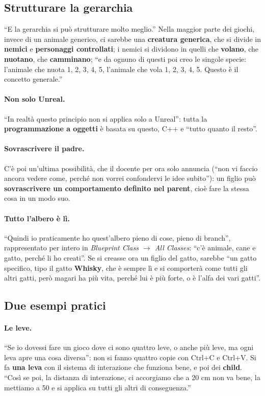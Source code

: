 \subsection{Strutturare la gerarchia}

``E la gerarchia si può strutturare molto meglio.'' Nella maggior parte dei
giochi, invece di un animale generico, ci sarebbe una \textbf{creatura
generica}, che si divide in \textbf{nemici} e \textbf{personaggi controllati};
i nemici si dividono in quelli che \textbf{volano}, che \textbf{nuotano}, che
\textbf{camminano}; ``e da ognuno di questi poi creo le singole specie: l'animale
che nuota 1, 2, 3, 4, 5, l'animale che vola 1, 2, 3, 4, 5. Questo è il concetto
generale.''

\paragraph{Non solo Unreal.} ``In realtà questo principio non si applica solo a
Unreal'': tutta la \textbf{programmazione a oggetti} è basata su questo, C++ e
``tutto quanto il resto''.

\paragraph{Sovrascrivere il padre.} C'è poi un'ultima possibilità, che il docente
per ora solo annuncia (``non vi faccio ancora vedere come, perché non vorrei
confondervi le idee subito''): un figlio può \textbf{sovrascrivere un
comportamento definito nel parent}, cioè fare la stessa cosa in un modo suo.

\paragraph{Tutto l'albero è lì.} ``Quindi io praticamente ho quest'albero pieno
di cose, pieno di branch'', rappresentato per intero in \emph{Blueprint Class
$\rightarrow$ All Classes}: ``c'è animale, cane e gatto, perché li ho creati''.
Se si creasse ora un figlio del gatto, sarebbe ``un gatto specifico, tipo il
gatto \textbf{Whisky}, che è sempre lì e si comporterà come tutti gli altri
gatti, però magari ha più vita, perché lui è più forte, o è l'alfa dei vari
gatti''.

\subsection{Due esempi pratici}

\paragraph{Le leve.} ``Se io dovessi fare un gioco dove ci sono quattro leve, o
anche più leve, ma ogni leva apre una cosa diversa'': non si fanno quattro
copie con Ctrl+C e Ctrl+V. Si fa \textbf{una leva} con il sistema di interazione
che funziona bene, e poi dei \textbf{child}. ``Così se poi, la distanza di
interazione, ci accorgiamo che a 20 cm non va bene, la mettiamo a 50 e si applica
su tutti gli altri di conseguenza.''

